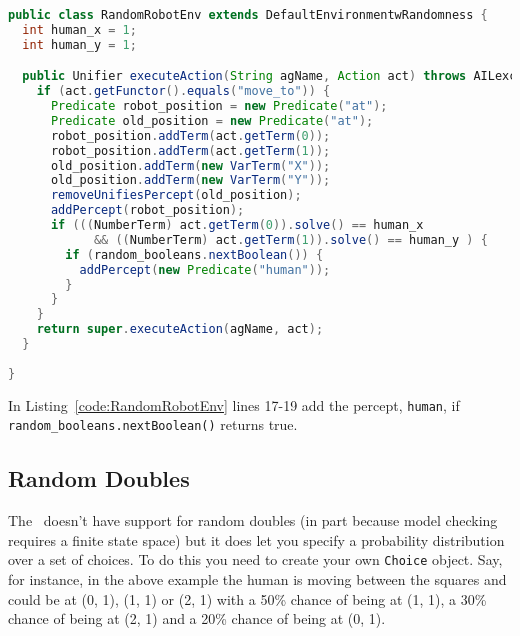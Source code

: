 \documentclass[a4]{article}
\begin{document}
\begin{lstlisting}[float,caption=RandomRobotEnv,basicstyle=\sffamily,language=Java,style=easslisting,label=code:RandomRobotEnv]
public class RandomRobotEnv extends DefaultEnvironmentwRandomness {
  int human_x = 1;
  int human_y = 1;

  public Unifier executeAction(String agName, Action act) throws AILexception {
    if (act.getFunctor().equals("move_to")) {
      Predicate robot_position = new Predicate("at");
      Predicate old_position = new Predicate("at");
      robot_position.addTerm(act.getTerm(0));
      robot_position.addTerm(act.getTerm(1));
      old_position.addTerm(new VarTerm("X"));
      old_position.addTerm(new VarTerm("Y"));
      removeUnifiesPercept(old_position);
      addPercept(robot_position);
      if (((NumberTerm) act.getTerm(0)).solve() == human_x 
            && ((NumberTerm) act.getTerm(1)).solve() == human_y ) {
        if (random_booleans.nextBoolean()) {
          addPercept(new Predicate("human"));
        }
      }
    }
    return super.executeAction(agName, act);
  }
	      
}
\end{lstlisting}

\begin{sloppypar}
In Listing~\ref{code:RandomRobotEnv} lines 17-19 add the percept, \lstinline{human}, if \texttt{random\_booleans.nextBoolean()} returns true.
\end{sloppypar}

\subsection{Random Doubles}
The \ail\ doesn't have support for random doubles (in part because model checking requires a finite state space) but it does let you specify a probability distribution over a set of choices.  To do this you need to create your own \texttt{Choice} object.  Say, for instance, in the above example the human is moving between the squares and could be at (0, 1), (1, 1) or (2, 1) with a 50\% chance of being at (1, 1), a 30\% chance of being at (2, 1) and a 20\% chance of being at (0, 1).
\end{document}
